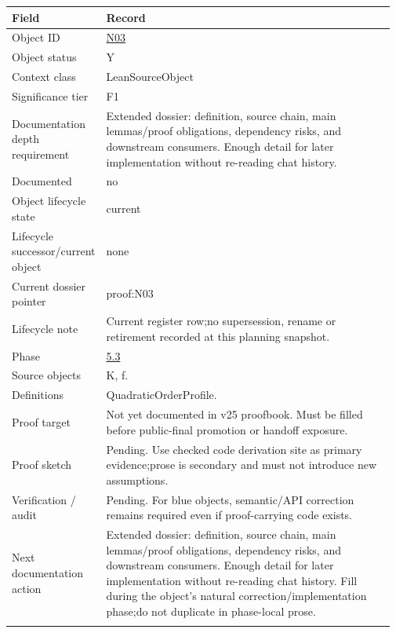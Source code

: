 \begin{longtable}{L{0.16\linewidth} L{0.81\linewidth}}
\hline
\textbf{Field} & \textbf{Record}\\
\hline
Object ID & \hyperlink{object-row-N03}{N03}\\
\hline\addlinespace[0.20em]
Object status & Y\\
\hline\addlinespace[0.20em]
Context class & LeanSourceObject\\
\hline\addlinespace[0.20em]
Significance tier & F1\\
\hline\addlinespace[0.20em]
Documentation depth requirement & Extended dossier: definition, source chain, main lemmas/\allowbreak{}proof obligations, dependency risks, and downstream consumers. Enough detail for later implementation without re-reading chat history.\\
\hline\addlinespace[0.20em]
Documented & no\\
\hline\addlinespace[0.20em]
Object lifecycle state & current\\
\hline\addlinespace[0.20em]
Lifecycle successor/\allowbreak{}current object & none\\
\hline\addlinespace[0.20em]
Current dossier pointer & proof:N03\\
\hline\addlinespace[0.20em]
Lifecycle note & Current register row;\newline no supersession, rename or retirement recorded at this planning snapshot.\\
\hline\addlinespace[0.20em]
Phase & \hyperlink{phase-row-5-3}{5.3}\\
\hline\addlinespace[0.20em]
Source objects & K, f.\\
\hline\addlinespace[0.20em]
Definitions & QuadraticOrderProfile.\\
\hline\addlinespace[0.20em]
Proof target & Not yet documented in v25 proofbook. Must be filled before public-final promotion or handoff exposure.\\
\hline\addlinespace[0.20em]
Proof sketch & Pending. Use checked code derivation site as primary evidence;\newline prose is secondary and must not introduce new assumptions.\\
\hline\addlinespace[0.20em]
Verification /\allowbreak{} audit & Pending. For blue objects, semantic/\allowbreak{}API correction remains required even if proof-carrying code exists.\\
\hline\addlinespace[0.20em]
Next documentation action & Extended dossier: definition, source chain, main lemmas/\allowbreak{}proof obligations, dependency risks, and downstream consumers. Enough detail for later implementation without re-reading chat history. Fill during the object's natural correction/\allowbreak{}implementation phase;\newline do not duplicate in phase-local prose.\\
\hline\addlinespace[0.20em]
\end{longtable}
